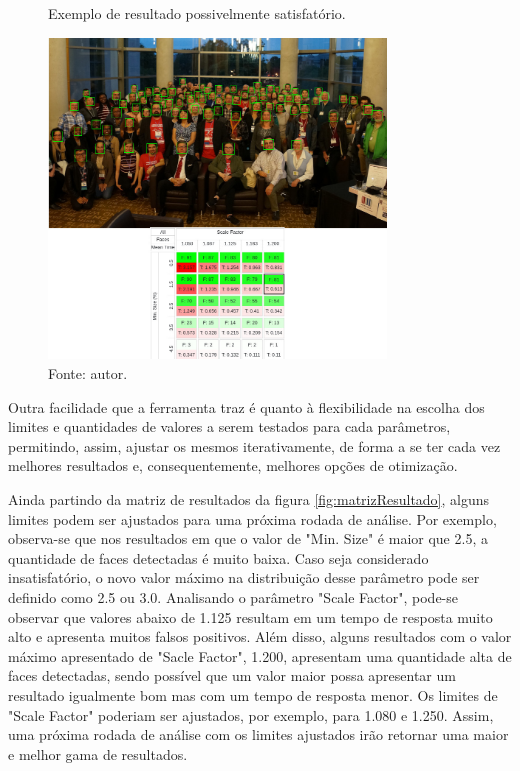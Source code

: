 \begin{figure}[h]
    \centering
    \caption[Exemplo de resultado possivelmente satisfatório.]{Exemplo de resultado possivelmente satisfatório.}
    \includegraphics[width=0.8\textwidth]{Cap3_Desenvolvimento/Figures/exemplo_resultado_3.jpg}
    \caption*{Fonte: autor.}
    \label{fig:exemploResultado3}
\end{figure}


Outra facilidade que a ferramenta traz é quanto à flexibilidade na escolha dos limites e quantidades de valores a serem testados para cada parâmetros, permitindo, assim, ajustar os mesmos iterativamente, de forma a se ter cada vez melhores resultados e, consequentemente, melhores opções de otimização.

Ainda partindo da matriz de resultados da figura \ref{fig:matrizResultado}, alguns limites podem ser ajustados para uma próxima rodada de análise. Por exemplo, observa-se que nos resultados em que o valor de "Min. Size" é maior que 2.5, a quantidade de faces detectadas é muito baixa. Caso seja considerado insatisfatório, o novo valor máximo na distribuição desse parâmetro pode ser definido como 2.5 ou 3.0. Analisando o parâmetro "Scale Factor", pode-se observar que valores abaixo de 1.125 resultam em um tempo de resposta muito alto e apresenta muitos falsos positivos. Além disso, alguns resultados com o valor máximo apresentado de "Sacle Factor", 1.200, apresentam uma quantidade alta de faces detectadas, sendo possível que um valor maior possa apresentar um resultado igualmente bom mas com um tempo de resposta menor. Os limites de "Scale Factor" poderiam ser ajustados, por exemplo, para 1.080 e 1.250. Assim, uma próxima rodada de análise com os limites ajustados irão retornar uma maior e melhor gama de resultados.

